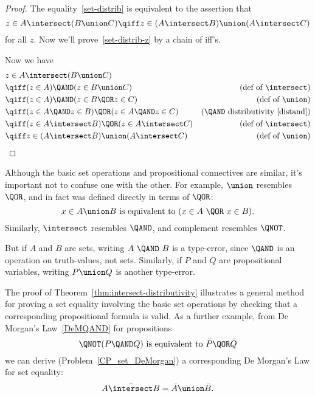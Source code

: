 \begin{proof}
The equality~\eqref{set-distrib} is equivalent to the assertion that
\begin{equation}\label{set-distrib-z}
  z \in A \intersect (B \union C) \qiff z \in (A \intersect B)
  \union (A \intersect C)
\end{equation}
for all $z$.  Now we'll prove~\eqref{set-distrib-z} by a chain of iff's.

Now we have
\begin{align*}
\lefteqn{z \in A \intersect (B \union C)}\\
& \qiff (z \in A) \QAND (z \in B \union C) & \text{(def of $\intersect$)}\\
& \qiff (z \in A) \QAND (z \in B \QOR z \in C)
                & \text{(def of $\union$)}\\
& \qiff (z \in A \QAND z \in B) \QOR (z \in A \QAND z \in C)
                & \text{(\QAND\ distributivity~\eqref{distand})}\\
& \qiff (z \in A \intersect B) \QOR (z \in A \intersect C)
                & \text{(def of $\intersect$)}\\
& \qiff z \in (A \intersect B) \union (A \intersect C)
                & \text{(def of $\union$)}
\end{align*}

\end{proof}
  
Although the basic set operations and propositional connectives are
similar, it's important not to confuse one with the other.  For
example, $\union$ resembles $\QOR$, and in fact was defined directly
in terms of $\QOR$:
\[
x \in A \union B  \text{  is equivalent to  } (x \in A\ \QOR\ x \in B).
\]
Similarly, $\intersect$ resembles $\QAND$, and complement resembles $\QNOT$.
\iffalse
\[
x \in A \intersect B  \text{  is equivalent to  } x \in A\ \QAND\ x \in B,
\]
and
\[
x \in \bar{A}  \text{  is equivalent to  } \QNOT(x \in A).
\]
\fi

But if $A$ and $B$ are sets, writing $A\ \QAND\ B$ is a type-error,
since $\QAND$ is an operation on truth-values, not sets.  Similarly,
if $P$ and $Q$ are propositional variables, writing $P \union Q$ is
another type-error.

The proof of Theorem~\ref{thm:intersect-distributivity} illustrates a
general method for proving a set equality involving the basic set
operations by checking that a corresponding propositional formula is
valid.  As a further example, from De Morgan's Law~\eqref{DeMQAND} for
propositions
\[
\QNOT(P \QAND Q)  \text{  is equivalent to  } \bar{P} \QOR \bar{Q}
\]
we can derive (Problem~\ref{CP_set_DeMorgan}) a corresponding De
Morgan's Law for set equality:
\begin{equation}\label{set-demorgan}
\bar{A \intersect B} = \bar{A} \union \bar{B}.
\end{equation}

